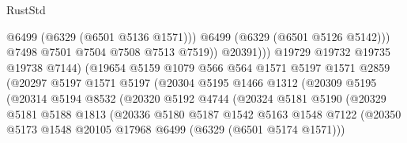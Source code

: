 \begin{lexlean}{RustStd}
\begin{coremodule}
{{                                        @6499
                                        (@6329 (@6501 @5136 @1571)))
                                      @6499
                                      (@6329 (@6501 @5126 @5142)))
                                    @7498
                                    @7501
                                    @7504
                                    @7508
                                    @7513
                                    @7519))
                                @20391)))
                          @19729
                          @19732
                          @19735
                          @19738
                          @7144)
                        (@19654
                          @5159
                          @1079
                          @566
                          @564
                          @1571
                          @5197
                          @1571
                          @2859
                          (@20297
                            @5197
                            @1571
                            @5197
                            (@20304
                              @5195
                              @1466
                              @1312
                              (@20309
                                @5195
                                (@20314
                                  @5194
                                  @8532
                                  (@20320
                                    @5192
                                    @4744
                                    (@20324
                                      @5181
                                      @5190
                                      (@20329
                                        @5181
                                        @5188
                                        @1813
                                        (@20336
                                          @5180
                                          @5187
                                          @1542
                                          @5163
                                          @1548
                                          @7122
                                          (@20350
                                            @5173
                                            @1548
                                            @20105
                                            @17968
                                            @6499
                                            (@6329 (@6501 @5174 @1571)))
}}
\end{coremodule}
\end{lexlean}
